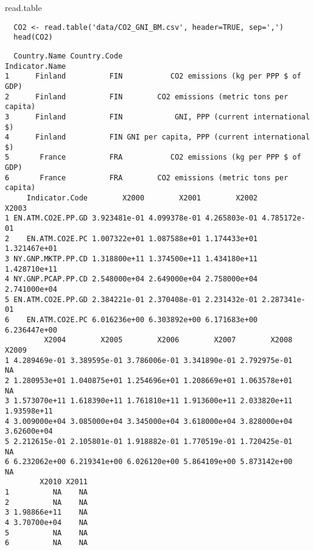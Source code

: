 \documentclass[xcolor={usenames,svgnames,dvipsnames}]{beamer}
\begin{document}
\begin{frame}[fragile,label=sec-2-2]{read.table}
 \lstset{language=R,label= ,caption= ,numbers=none}
\begin{lstlisting}
  CO2 <- read.table('data/CO2_GNI_BM.csv', header=TRUE, sep=',')
  head(CO2)
\end{lstlisting}

\begin{verbatim}
  Country.Name Country.Code                                Indicator.Name
1      Finland          FIN           CO2 emissions (kg per PPP $ of GDP)
2      Finland          FIN        CO2 emissions (metric tons per capita)
3      Finland          FIN            GNI, PPP (current international $)
4      Finland          FIN GNI per capita, PPP (current international $)
5       France          FRA           CO2 emissions (kg per PPP $ of GDP)
6       France          FRA        CO2 emissions (metric tons per capita)
     Indicator.Code        X2000        X2001        X2002        X2003
1 EN.ATM.CO2E.PP.GD 3.923481e-01 4.099378e-01 4.265803e-01 4.785172e-01
2    EN.ATM.CO2E.PC 1.007322e+01 1.087588e+01 1.174433e+01 1.321467e+01
3 NY.GNP.MKTP.PP.CD 1.318800e+11 1.374500e+11 1.434180e+11 1.428710e+11
4 NY.GNP.PCAP.PP.CD 2.548000e+04 2.649000e+04 2.758000e+04 2.741000e+04
5 EN.ATM.CO2E.PP.GD 2.384221e-01 2.370408e-01 2.231432e-01 2.287341e-01
6    EN.ATM.CO2E.PC 6.016236e+00 6.303892e+00 6.171683e+00 6.236447e+00
         X2004        X2005        X2006        X2007        X2008       X2009
1 4.289469e-01 3.389595e-01 3.786006e-01 3.341890e-01 2.792975e-01          NA
2 1.280953e+01 1.040875e+01 1.254696e+01 1.208669e+01 1.063578e+01          NA
3 1.573070e+11 1.618390e+11 1.761810e+11 1.913600e+11 2.033820e+11 1.93598e+11
4 3.009000e+04 3.085000e+04 3.345000e+04 3.618000e+04 3.828000e+04 3.62600e+04
5 2.212615e-01 2.105801e-01 1.918882e-01 1.770519e-01 1.720425e-01          NA
6 6.232062e+00 6.219341e+00 6.026120e+00 5.864109e+00 5.873142e+00          NA
        X2010 X2011
1          NA    NA
2          NA    NA
3 1.98866e+11    NA
4 3.70700e+04    NA
5          NA    NA
6          NA    NA
\end{verbatim}
\end{frame}
\end{document}
